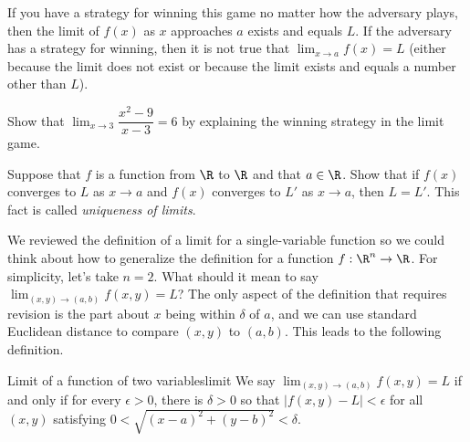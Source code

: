 \documentclass{watsonbook}
\begin{document}
If you have a strategy for winning this game no matter how the
adversary plays, then the limit of $f(x)$ as $x$ approaches $a$ exists
and equals $L$. If the adversary has a strategy for winning, then it
is not true that $\lim_{x \to a} f(x) = L$ (either because the limit
does not exist or because the limit exists and equals a number other
than $L$).

\begin{exercise}{}{}
  Show that $\displaystyle{\lim_{x \to 3}}\dfrac{x^2 - 9}{x - 3} = 6$
  by explaining the winning strategy in the limit game.
\end{exercise}

\begin{exercise}{}{}
  Suppose that $f$ is a function from $\R$ to $\R$ and that
  $a \in \R$. Show that if $f(x)$ converges to $L$ as $x\to a$ and
  $f(x)$ converges to $L'$ as $x\to a$, then $L = L'$. This fact is
  called \textit{uniqueness of limits}.
\end{exercise}

We reviewed the definition of a limit for a single-variable function
so we could think about how to generalize the definition for a
function $f:\R^n \to \R$. For simplicity, let's take $n = 2$. What
should it mean to say
$\displaystyle{\lim_{(x,y) \to (a,b)} f(x,y)} = L$? The only aspect of
the definition that requires revision is the part about $x$ being
within $\delta$ of $a$, and we can use standard Euclidean distance to
compare $(x,y)$ to $(a,b)$. This leads to the following
definition.

\begin{defn}{Limit of a function of two variables}{limit}
  We say $\lim_{(x,y)\to (a,b)} f(x,y) = L$ if and only if for every
  $\epsilon > 0$, there is $\delta>0$ so that
  $|f(x,y) - L| < \epsilon$ for all $(x,y)$ satisfying
  $0 < \sqrt{(x -a)^2 + (y-b)^2} < \delta$.
\end{defn}

\newpage 
\end{document}
